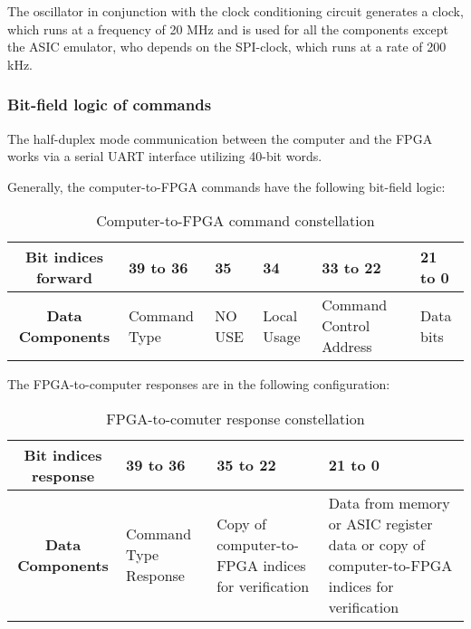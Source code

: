 The oscillator in conjunction with the clock conditioning circuit generates a clock, which runs at a frequency of 20 MHz and is used for all the components except the ASIC emulator, who depends on the SPI-clock, which runs at a rate of 200 kHz.

\subsubsection{Bit-field logic of commands}
The half-duplex mode communication between the computer and the FPGA works via a serial UART interface utilizing 40-bit words.
\newline

Generally, the computer-to-FPGA commands have the following bit-field logic:

\begin{table}[H]

\caption[]{Computer-to-FPGA command constellation}
    \label{tab:4}
    
  \begin{center}  
  \begin{tabular}{|c|p{2cm}|p{2cm}|p{2.5cm}|p{2cm}|p{2cm}|}
  \hline
  \textbf{Bit indices forward}  & 39 to 36  & 35 & 34 & 33 to 22 & 21 to 0\\ 
  \hline
  \textbf{Data Components} & Command \newline Type & NO USE & Local Usage & Command Control Address & Data bits \\
  \hline
  
\end{tabular}
\end{center}
\end{table}

The FPGA-to-computer responses are in the following configuration:


\begin{table}[H]

\caption[]{FPGA-to-comuter response constellation}
    \label{tab:5}
    
  \begin{center}  
  \begin{tabular}{|c|p{3cm}|p{3cm}|p{3cm}|}
  \hline
  \textbf{Bit indices response}  & 39 to 36  & 35 to 22 & 21 to 0 \\ 
  \hline
  \textbf{Data Components} & Command Type Response & Copy of computer-to-FPGA indices for verification & Data from memory or ASIC register data or copy of computer-to-FPGA indices for verification \\
  \hline
  
\end{tabular}
\end{center}
\end{table}


